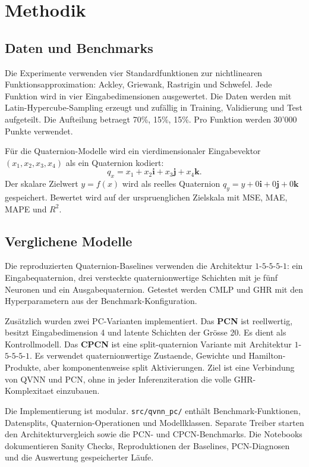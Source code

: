 \section{Methodik}

\subsection{Daten und Benchmarks}

Die Experimente verwenden vier Standardfunktionen zur nichtlinearen Funktionsapproximation: Ackley, Griewank, Rastrigin und Schwefel. Jede Funktion wird in vier Eingabedimensionen ausgewertet. Die Daten werden mit Latin-Hypercube-Sampling erzeugt und zufällig in Training, Validierung und Test aufgeteilt. Die Aufteilung betraegt 70\%, 15\%, 15\%. Pro Funktion werden 30'000 Punkte verwendet.

Für die Quaternion-Modelle wird ein vierdimensionaler Eingabevektor $(x_1,x_2,x_3,x_4)$ als ein Quaternion kodiert:
\[
q_x = x_1 + x_2\mathbf{i}+x_3\mathbf{j}+x_4\mathbf{k}.
\]
Der skalare Zielwert $y=f(x)$ wird als reelles Quaternion $q_y=y+0\mathbf{i}+0\mathbf{j}+0\mathbf{k}$ gespeichert. Bewertet wird auf der urspruenglichen Zielskala mit MSE, MAE, MAPE und $R^2$.

\subsection{Verglichene Modelle}

Die reproduzierten Quaternion-Baselines verwenden die Architektur $1$-$5$-$5$-$5$-$1$: ein Eingabequaternion, drei versteckte quaternionwertige Schichten mit je fünf Neuronen und ein Ausgabequaternion. Getestet werden CMLP und GHR mit den Hyperparametern aus der Benchmark-Konfiguration.

Zusätzlich wurden zwei PC-Varianten implementiert. Das \textbf{PCN} ist reellwertig, besitzt Eingabedimension 4 und latente Schichten der Grösse 20. Es dient als Kontrollmodell. Das \textbf{CPCN} ist eine split-quaternion Variante mit Architektur $1$-$5$-$5$-$5$-$1$. Es verwendet quaternionwertige Zustaende, Gewichte und Hamilton-Produkte, aber komponentenweise split Aktivierungen. Ziel ist eine Verbindung von QVNN und PCN, ohne in jeder Inferenziteration die volle GHR-Komplexitaet einzubauen.

Die Implementierung ist modular. \texttt{src/qvnn\_pc/} enthält Benchmark-Funktionen, Datensplits, Quaternion-Operationen und Modellklassen. Separate Treiber starten den Architekturvergleich sowie die PCN- und CPCN-Benchmarks. Die Notebooks dokumentieren Sanity Checks, Reproduktionen der Baselines, PCN-Diagnosen und die Auswertung gespeicherter Läufe.


